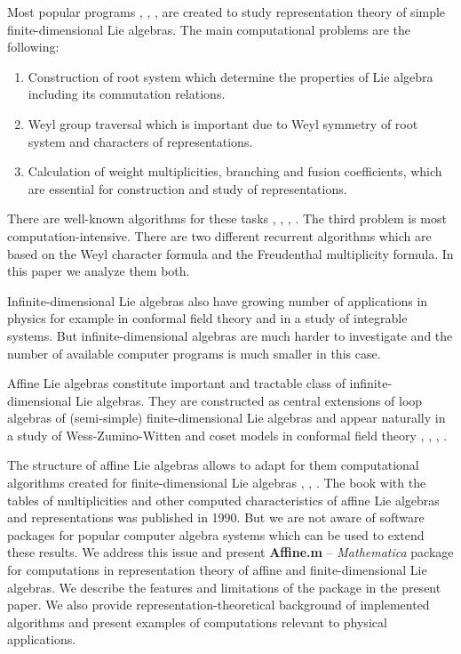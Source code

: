 Most popular programs \cite{simplie}, \cite{vanleeuwen1994lsp}, \cite{fischbacher2002ilp}, \cite{coxweyl} are created to study representation theory of simple finite-dimensional Lie algebras. The main computational problems are the following:
\begin{enumerate}
\item Construction of root system which determine the properties of Lie algebra including its commutation relations.
\item Weyl group traversal which is important due to Weyl symmetry of root system and characters of representations.
\item Calculation of weight multiplicities, branching and fusion coefficients, which are essential for construction and study of representations.
\end{enumerate}
There are well-known algorithms for these tasks \cite{moody1982fast}, \cite{stembridge2001computational}, \cite{belinfante1989survey}, \cite{casselman1994machine}.
The third problem is most computation-intensive. There are two different recurrent algorithms which are based on the Weyl character formula and the Freudenthal multiplicity formula. In this paper we analyze them both.

Infinite-dimensional Lie algebras also have growing number of applications in physics for example in conformal field theory and in a study of  integrable systems. But infinite-dimensional algebras are much harder to investigate and the number of available computer programs is much smaller in this case.

Affine Lie algebras \cite{kac1990idl} constitute important and tractable class of infinite-dimensional Lie algebras. They are constructed as central extensions of loop algebras of (semi-simple) finite-dimensional Lie algebras and appear naturally in a study of Wess-Zumino-Witten and coset models in conformal field theory \cite{Walton:1999xc}, \cite{difrancesco1997cft}, \cite{Goddard198588}, \cite{Dunbar:1992gh}.

The structure of affine Lie algebras allows to adapt for them computational algorithms created for finite-dimensional Lie algebras  \cite{Fuchs:1996dd}, \cite{gannon2001algorithms}, \cite{kass1990ala}. The book \cite{kass1990ala} with the tables of multiplicities and other computed characteristics of affine Lie algebras and representations was published in 1990. But we are not aware of software packages for popular computer algebra systems which can be used to extend these results.
We address this issue and present {\bf Affine.m} -- {\it Mathematica} package for computations in representation theory of affine and finite-dimensional Lie algebras.  We describe the features and limitations of the package in the present paper.  We also provide representation-theoretical background of implemented algorithms and present examples of computations relevant to physical applications.


